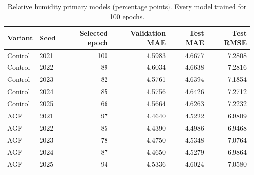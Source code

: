 \documentclass[10pt,a4paper]{article}
\begin{document}
\begin{table}[H]\centering\small\setlength{\tabcolsep}{5pt}\setlength{\parskip}{0pt}

\caption{Relative humidity primary models (percentage points). Every model trained for 100 epochs.}\label{tab:seeds_humidity}

\begin{tabular}{llrrrr}

\toprule
Variant & Seed & Selected epoch & Validation MAE & Test MAE & Test RMSE \\
\midrule

Control & 2021 & 100 & 4.5983 & 4.6677 & 7.2808 \\

Control & 2022 & 89 & 4.6034 & 4.6638 & 7.2816 \\

Control & 2023 & 82 & 4.5761 & 4.6394 & 7.1854 \\

Control & 2024 & 85 & 4.5756 & 4.6426 & 7.2712 \\

Control & 2025 & 66 & 4.5664 & 4.6263 & 7.2232 \\

AGF & 2021 & 97 & 4.4640 & 4.5222 & 6.9809 \\

AGF & 2022 & 85 & 4.4390 & 4.4986 & 6.9468 \\

AGF & 2023 & 78 & 4.4750 & 4.5348 & 7.0764 \\

AGF & 2024 & 87 & 4.4650 & 4.5279 & 6.9864 \\

AGF & 2025 & 94 & 4.5336 & 4.6024 & 7.0580 \\

\bottomrule\end{tabular}\end{table}
\end{document}
